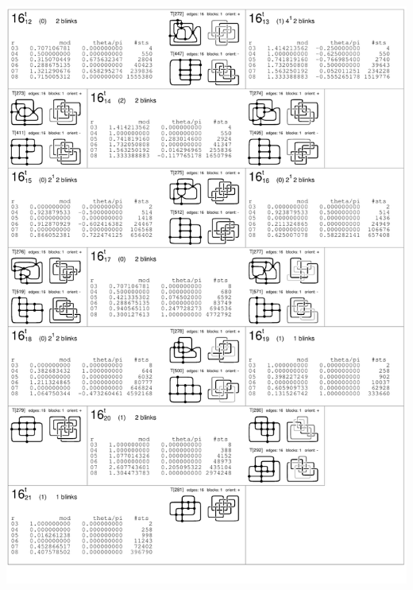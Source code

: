 \begin{center}
 \includegraphics[height=23.5cm]{E.figsbw2/con3catalog016_bw.pdf} \eject  

\end{center}
